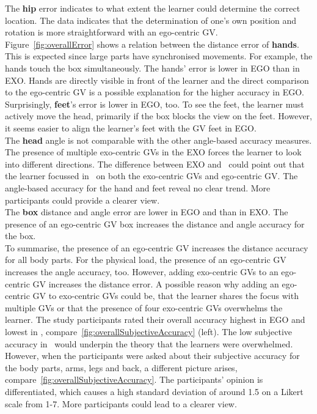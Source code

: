 The \textbf{hip} error indicates to what extent the learner could determine the correct location. The data indicates that the determination of one's own position and rotation is more straightforward with an ego-centric GV.\\
Figure~\ref{fig:overallError} shows a relation between the distance error of \textbf{hands}. This is expected since large parts have synchronised movements. For example, the hands touch the box simultaneously. The hands' error is lower in EGO than in EXO. Hands are directly visible in front of the learner and the direct comparison to the ego-centric GV is a possible explanation for the higher accuracy in EGO.\\
Surprisingly, \textbf{feet}'s error is lower in EGO, too. To see the feet, the learner must actively move the head, primarily if the box blocks the view on the feet. However, it seems easier to align the learner's feet with the GV feet in EGO.\\
The \textbf{head} angle is not comparable with the other angle-based accuracy measures. The presence of multiple exo-centric GVs in the EXO forces the learner to look into different directions. The difference between EXO and \combi\ could point out that the learner focussed in \combi\ on both the exo-centric GVs and ego-centric GV. The angle-based accuracy for the hand and feet reveal no clear trend. More participants could provide a clearer view.\\
The \textbf{box} distance and angle error are lower in EGO and \combi than in EXO. The presence of an ego-centric GV box increases the distance and angle accuracy for the box.\\

To summarise, the presence of an ego-centric GV increases the distance accuracy for all body parts. For the physical load, the presence of an ego-centric GV increases the angle accuracy, too. However, adding exo-centric GVs to an ego-centric GV increases the distance error. A possible reason why adding an ego-centric GV to exo-centric GVs could be, that the learner shares the focus with multiple GVs or that the presence of four exo-centric GVs overwhelms the learner. The study participants rated their overall accuracy highest in EGO and lowest in \combi, compare~\ref{fig:overallSubjectiveAccuracy} (left). The low subjective accuracy in \combi\ would underpin the theory that the learners were overwhelmed. However, when the participants were asked about their subjective accuracy for the body parts, arms, legs and back, a different picture arises, compare~\ref{fig:overallSubjectiveAccuracy}. The participants' opinion is differentiated, which causes a high standard deviation of around 1.5 on a Likert scale from 1-7. More participants could lead to a clearer view.\\

